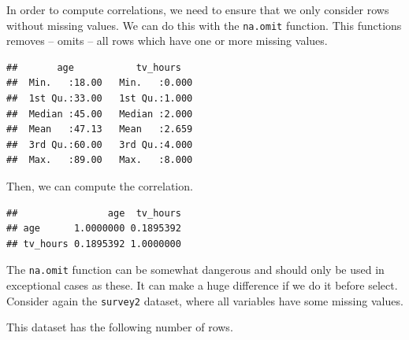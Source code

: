 \documentclass[]{tufte-book}
\newenvironment{Shaded}{}{}
\newcommand{\KeywordTok}[1]{\textcolor[rgb]{0.00,0.44,0.13}{\textbf{#1}}}
\newcommand{\NormalTok}[1]{#1}
\newcommand{\OperatorTok}[1]{\textcolor[rgb]{0.40,0.40,0.40}{#1}}
\newcommand{\StringTok}[1]{\textcolor[rgb]{0.25,0.44,0.63}{#1}}
\begin{document}
In order to compute correlations, we need to ensure that we only consider rows without missing values. We can do this with the \texttt{na.omit} function. This functions removes -- omits -- all rows which have one or more missing values.

\begin{Shaded}
\end{Shaded}

\begin{verbatim}
##       age           tv_hours    
##  Min.   :18.00   Min.   :0.000  
##  1st Qu.:33.00   1st Qu.:1.000  
##  Median :45.00   Median :2.000  
##  Mean   :47.13   Mean   :2.659  
##  3rd Qu.:60.00   3rd Qu.:4.000  
##  Max.   :89.00   Max.   :8.000
\end{verbatim}

Then, we can compute the correlation.

\begin{Shaded}
\end{Shaded}

\begin{verbatim}
##                age  tv_hours
## age      1.0000000 0.1895392
## tv_hours 0.1895392 1.0000000
\end{verbatim}

The \texttt{na.omit} function can be somewhat dangerous and should only be used in exceptional cases as these. It can make a huge difference if we do it before select. Consider again the \texttt{survey2} dataset, where all variables have some missing values.

This dataset has the following number of rows.

\begin{Shaded}
\end{Shaded}
\end{document}
